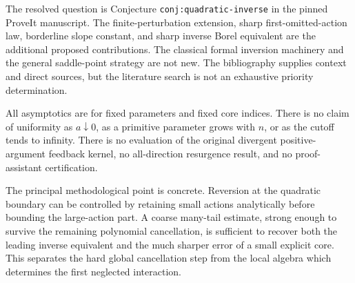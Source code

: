 \documentclass[11pt,a4paper]{article}
\numberwithin{equation}{section}
\theoremstyle{definition}
\theoremstyle{remark}
\begin{document}
The resolved question is Conjecture \texttt{conj:quadratic-inverse} in the
pinned ProveIt manuscript. The finite-perturbation extension, sharp
first-omitted-action law, borderline slope constant, and sharp inverse
Borel equivalent are the additional proposed contributions. The classical
formal inversion machinery and the general saddle-point strategy are
not new. The bibliography supplies context and direct sources, but the
literature search is not an exhaustive priority determination.

All asymptotics are for fixed parameters and fixed core indices. There
is no claim of uniformity as $a\downarrow0$, as a primitive parameter grows
with $n$, or as the cutoff tends to infinity. There is no evaluation of the
original divergent positive-argument feedback kernel, no all-direction
resurgence result, and no proof-assistant certification.

The principal methodological point is concrete. Reversion at the quadratic
boundary can be controlled by retaining small actions analytically before
bounding the large-action part. A coarse many-tail estimate, strong enough
to survive the remaining polynomial cancellation, is sufficient to recover
both the leading inverse equivalent and the much sharper error of a small
explicit core. This separates the hard global cancellation step from the
local algebra which determines the first neglected interaction.
\end{document}
